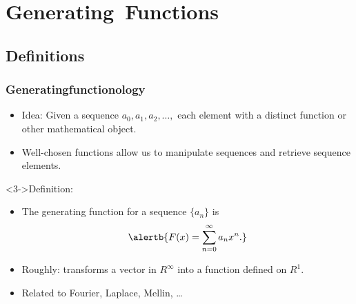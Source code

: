 
\section{Generating\ Functions}

\subsection{Definitions}

\begin{frame}[label=]
  \frametitle{Generatingfunctionology\cite{wilf2006a}}
  
    \begin{itemize}
    \item<1->
      \alert{Idea:} Given a sequence 
      \alert{$a_0, a_1, a_2, \ldots,$}
       each element with a 
      distinct function or other mathematical object.
    \item<2->
      Well-chosen functions allow us 
      to manipulate sequences and retrieve
      sequence elements.
    \end{itemize}

  \begin{block}<3->{Definition:}
    \begin{itemize}
    \item<3->
      The \alert{generating function}  for a sequence 
      $\{a_n\}$
      is
      $$
      \alertb{
      F(x) = \sum_{n=0}^{\infty} a_n x^n.
      }
      $$
    \item<4->
      Roughly: transforms a vector in $R^\infty$
      into a function defined on $R^{1}$.
    \item<5->
      Related to Fourier, Laplace, Mellin, \ldots
    \end{itemize}
  \end{block}

\end{frame}

